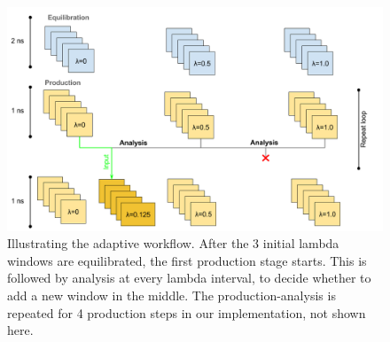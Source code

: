 


\begin{figure}
  \centering
  \includegraphics[width=\columnwidth]{figures/Adaptive_TIES_1.png}
  \caption{Illustrating the adaptive workflow. After the 3
  initial lambda windows are equilibrated, the first production stage starts.
  This is followed by analysis at every lambda interval, to decide whether to
  add a new window in the middle. The production-analysis is repeated for 4
  production steps in our implementation, not shown here.}
\label{fig:adaptive_TIES}
\end{figure}

